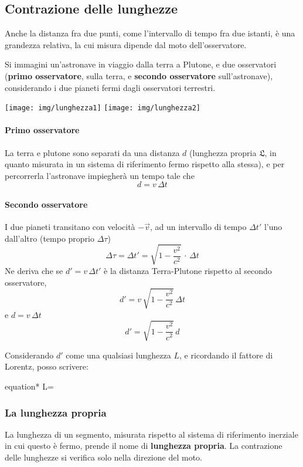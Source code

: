 \documentclass[a4paper, oneside]{article}
\newcommand*\mygraybox[0]{%
		\tcbhighmath}
\newcommand{\equazione}[1]{	\begin{empheq}[box=\mygraybox]{equation*}
			#1
		\end{empheq}}
\newcounter{i}%
\newcounter{n}%
\newcounter{I}%
\begin{document}
\subsection{Contrazione delle lunghezze}

Anche la distanza fra due punti, come l'intervallo di tempo fra due istanti, è una grandezza relativa, la cui misura dipende dal moto dell'osservatore.

Si immagini un'astronave in viaggio dalla terra a Plutone, e due osservatori (\textbf{primo osservatore}, sulla terra, e \textbf{secondo osservatore} sull'astronave), considerando i due pianeti fermi dagli osservatori terrestri.

\begin{center}
\texttt{[image: img/lunghezza1]}
\texttt{[image: img/lunghezza2]}
\end{center}

\paragraph{Primo osservatore} La terra e plutone sono separati da una distanza $d$ (lunghezza propria $\mathfrak{L}$, in quanto misurata in un sistema di riferimento fermo rispetto alla stessa), e per percorrerla l'astronave impiegherà un tempo tale che 
\[
d = v \,\Delta t
\]

\paragraph{Secondo osservatore} I due pianeti transitano con velocità $-\vec{v}$, ad un intervallo di tempo $\Delta t'$ l'uno dall'altro (tempo proprio $\Delta \tau$)
\[
\Delta\tau=\Delta t'=\sqrt{1-\frac{v^2}{c^2}}\,\cdot\,\Delta t
\]
Ne deriva che se $d'=v\,\Delta t'$ è la distanza Terra-Plutone rispetto al secondo osservatore, 
\[
d'=v \,\sqrt{1-\frac{v^2}{c^2}} \,\Delta t
\]
e $d = v\,\Delta t$
\[
d' = \sqrt{1-\frac{v^2}{c^2}} \, d
\]

Considerando $d'$ come una qualsiasi lunghezza $L$, e ricordando il fattore di Lorentz, posso scrivere:
\equazione{L=}

\subsubsection{La lunghezza propria}

La lunghezza di un segmento, misurata rispetto al sistema di riferimento inerziale in cui questo è fermo, prende il nome di \textbf{lunghezza propria}. La contrazione delle lunghezze si verifica solo nella direzione del moto.
\end{document}
